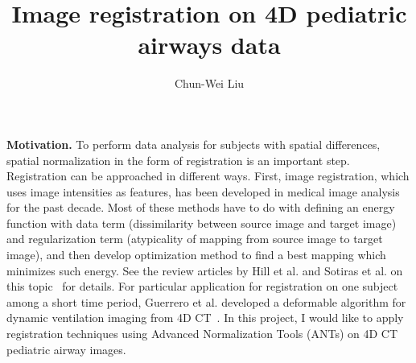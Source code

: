 \documentclass{article}
\begin{document}
%
%
%
%
\title{Image registration on 4D pediatric airways data}
%
%
\author{Chun-Wei Liu}
%
%
%


\maketitle              %

{\bf Motivation.} 
To perform data analysis for subjects with spatial differences, spatial normalization in the form of registration is an important step.
Registration can be approached in different ways.
First, image registration, which uses image intensities as features, has been developed in medical image analysis for the past decade.
Most of these methods have to do with defining an energy function with data term (dissimilarity between source image and target image) and regularization term (atypicality of mapping from source image to target image),
and then develop optimization method to find a best mapping which minimizes such energy.
See the review articles by Hill et al. and Sotiras et al. on this topic~\cite{hill2001medical,otiras2013deformable} for details.
For particular application for registration on one subject among a short time period, Guerrero et al. developed a deformable algorithm for dynamic ventilation imaging from 4D CT~\cite{guerrero2006dynamic}.
In this project, I would like to apply registration techniques using Advanced Normalization Tools (ANTs) on 4D CT pediatric airway images.
\end{document}
